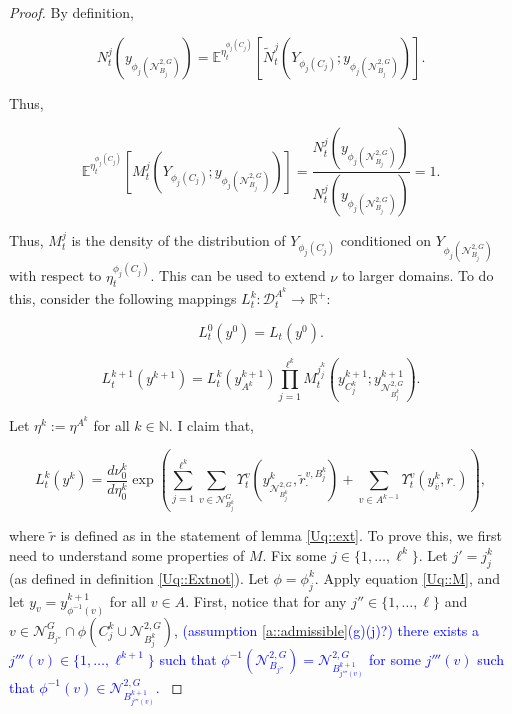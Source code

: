 \documentclass[12pt]{article}
\newcommand{\mb}{\mathbb}
\newcommand{\mc}{\mathcal}
\newcommand{\ra}{\rightarrow}
\newcommand{\ov}{\overline}
\newcommand{\tb}{\textcolor{blue}}
\newcommand{\exmu}[2]{\mb{E}^{#1}\left[#2\right]}	%
\newcommand{\defeq}{:=}								%
\newcommand{\cad}{\mc{D}}							%
\newcommand{\gneigh}[2]{\mc{N}^{#1}_{#2}}			%
\newcommand{\dgneigh}[2]{\mc{N}^{2,#1}_{#2}}		%
\newcommand{\cl}[1]{\ov{#1}}						%
\newcommand{\indx}[1]{^{#1}}						%
\newcommand{\rate}{r}								%
\newcommand{\xg}{y}									%
\newcommand{\vind}[1]{_{#1}}						%
\newcommand{\vpara}[1]{^{#1}}						%
\newcommand{\stpara}[1]{_{#1}}						%
\newcommand{\tpara}[1]{_{#1}}						%
\newcommand{\psize}{\ell}							%
\newcommand{\Xg}{Y}									%
\newcommand{\brate}{\alt{\rate}}					%
\newcommand{\alt}[1]{\tilde{#1}}					%
\newcommand{\mm}{\nu}								%
\newcommand{\mmm}{\eta}								%
\newcommand{\ds}{\Upsilon}							%
\newcommand{\dense}{L}								%
\newcommand{\densen}{N}								%
\newcommand{\denseph}{\alt{N}}						%
\newcommand{\mdense}{M}								%
\newcommand{\jpara}[1]{^{#1}}						%
\newcommand{\vjpara}[2]{^{#1,#2}}					%
\begin{document}
\begin{proof}
By definition, 

\[\densen\jpara{j}\tpara{t}(\xg\vind{\phi_j(\dgneigh{G}{B_j})}) = \exmu{\mmm\vpara{\phi_j(C_j)}\tpara{t}}{\denseph\jpara{j}\tpara{t}(\Xg\vind{\phi_j(C_j)};\xg\vind{\phi_j(\dgneigh{G}{B_j})})}.\]

Thus,

\[\exmu{\mmm\vpara{\phi_j(C_j)}\tpara{t}}{\mdense\jpara{j}\tpara{t}(\Xg\vind{\phi_j(C_j)};\xg\vind{\phi_j(\dgneigh{G}{B_j})})} = \frac{\densen\jpara{j}\tpara{t}(\xg\vind{\phi_j(\dgneigh{G}{B_j})})}{\densen\jpara{j}\tpara{t}(\xg\vind{\phi_j(\dgneigh{G}{B_j})})} = 1.\]

Thus, \(\mdense\jpara{j}\tpara{t}\) is the density of the distribution of \(\Xg\vind{\phi_j(C_j)}\) conditioned on \(\Xg\vind{\phi_j(\dgneigh{G}{B_j})}\) with respect to \(\mmm\vpara{\phi_j(C_j)}\tpara{t}\). This can be used to extend \(\mm\) to larger domains. To do this, consider the following mappings \(\dense\indx{k}\tpara{t}: \cad\vpara{A\indx{k}}\tpara{t} \ra \mb{R}^+\):

\[\dense\indx{0}\tpara{t}(\xg\indx{0}) = \dense\tpara{t}(\xg\indx{0}).\]

\[\dense\indx{k+1}\tpara{t}(\xg\indx{k+1}) = \dense\indx{k}\tpara{t}(\xg\indx{k+1}\vind{A\indx{k}})\prod_{j=1}^{\psize\indx{k}}\mdense\jpara{j\indx{k}_j}\tpara{t}\left(\xg\indx{k+1}\vind{C_j\indx{k}};\xg\indx{k+1}\vind{\dgneigh{G}{B\indx{k}_j}}\right).\]

Let \(\mmm\indx{k} \defeq \mmm\vpara{A\indx{k}}\) for all \(k\in \mb{N}\). I claim that,

\[\dense\indx{k}\tpara{t}(\xg\indx{k}) = \frac{d\mm\indx{k}\tpara{0}}{d\mmm\indx{k}\tpara{0}}\exp\left(\sum_{j=1}^{\psize\indx{k}}\sum_{v\in \gneigh{G}{B_j\indx{k}}} \ds\vpara{v}\tpara{t}\left(\xg\indx{k}\vind{\dgneigh{G}{B_j\indx{k}}},\brate\vjpara{v}{B\indx{k}_{j}}\stpara{\cdot}\right) + \sum_{v \in A\indx{k-1}} \ds\vpara{v}\tpara{t}\left(\xg\indx{k}\vind{\cl{v}},\rate\stpara{\cdot}\right)\right),\]

where \(\brate\) is defined as in the statement of lemma \ref{Uq::ext}. To prove this, we first need to understand some properties of \(\mdense\). Fix some \(j \in \{1,\dots,\psize\indx{k}\}\). Let \(j' = j\indx{k}_j\) (as defined in definition \ref{Uq::Extnot}). Let \(\phi = \phi\indx{k}_j\). Apply equation \eqref{Uq::M}, and let \(\xg\vind{v} = \xg\indx{k+1}\vind{\phi^{-1}(v)}\) for all \(v \in A\). First, notice that for any \(j'' \in \{1,\dots,\psize\}\) and \(v \in \gneigh{G}{B_{j''}}\cap\phi(C\indx{k}_j\cup\dgneigh{G}{B\indx{k}_{j}})\), \tb{(assumption \ref{a::admissible}(g)(j)?) there exists a \(j'''(v) \in \{1,\dots,\psize\indx{k+1}\}\) such that \(\phi^{-1}(\dgneigh{G}{B_{j''}}) = \dgneigh{G}{B\indx{k+1}_{j'''(v)}}\) for some \(j'''(v)\) such that \(\phi^{-1}(v) \in \dgneigh{G}{B\indx{k+1}_{j'''(v)}}\). }


\end{proof}
\end{document}
